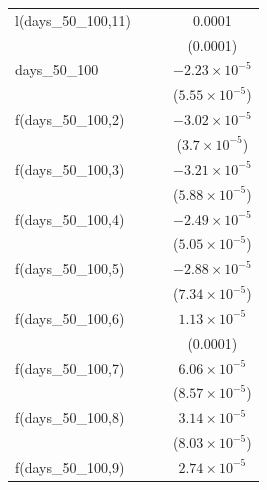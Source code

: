 \begin{tabular}{lccc}
   l(days\_50\_100,11)              &          &                       & 0.0001\\   
                                    &          &                       & (0.0001)\\   
   days\_50\_100                    &          &                       & $-2.23\times 10^{-5}$\\    
                                    &          &                       & ($5.55\times 10^{-5}$)\\    
   f(days\_50\_100,2)               &          &                       & $-3.02\times 10^{-5}$\\    
                                    &          &                       & ($3.7\times 10^{-5}$)\\    
   f(days\_50\_100,3)               &          &                       & $-3.21\times 10^{-5}$\\    
                                    &          &                       & ($5.88\times 10^{-5}$)\\    
   f(days\_50\_100,4)               &          &                       & $-2.49\times 10^{-5}$\\    
                                    &          &                       & ($5.05\times 10^{-5}$)\\    
   f(days\_50\_100,5)               &          &                       & $-2.88\times 10^{-5}$\\    
                                    &          &                       & ($7.34\times 10^{-5}$)\\    
   f(days\_50\_100,6)               &          &                       & $1.13\times 10^{-5}$\\    
                                    &          &                       & (0.0001)\\   
   f(days\_50\_100,7)               &          &                       & $6.06\times 10^{-5}$\\    
                                    &          &                       & ($8.57\times 10^{-5}$)\\    
   f(days\_50\_100,8)               &          &                       & $3.14\times 10^{-5}$\\    
                                    &          &                       & ($8.03\times 10^{-5}$)\\    
   f(days\_50\_100,9)               &          &                       & $2.74\times 10^{-5}$\\    

\end{tabular}
